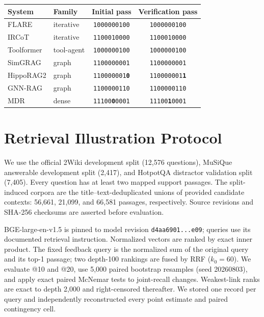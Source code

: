 \documentclass[11pt]{article}
\begin{document}
\begin{center}
\vspace{0.8em}
\label{tab:repeat-codes}
\setlength{\tabcolsep}{2.5pt}
\begin{tabular}{@{}llcc@{}}
\toprule
\textbf{System} & \textbf{Family} & \textbf{Initial pass} & \textbf{Verification pass} \\
\midrule
FLARE & iterative & \texttt{1000000100} & \texttt{1000000100} \\
IRCoT & iterative & \texttt{1100010000} & \texttt{1100010000} \\
Toolformer & tool-agent & \texttt{1000000100} & \texttt{1000000100} \\
SimGRAG & graph & \texttt{1100000001} & \texttt{1100000001} \\
HippoRAG2 & graph & \texttt{110000001\textbf{0}} & \texttt{110000001\textbf{1}} \\
GNN-RAG & graph & \texttt{1100000110} & \texttt{1100000110} \\
MDR & dense & \texttt{11100\textbf{0}0001} & \texttt{11100\textbf{1}0001} \\
\bottomrule
\end{tabular}
\end{center}

\clearpage

\section{Retrieval Illustration Protocol}
\label{app:experiment}
We use the official 2Wiki development split (12,576 questions), MuSiQue answerable development split
(2,417), and HotpotQA distractor validation split (7,405). Every question has at least two mapped
support passages. The split-induced corpora are the title--text-deduplicated unions of provided candidate
contexts: 56,661, 21,099, and 66,581 passages, respectively. Source revisions and SHA-256 checksums are
asserted before evaluation.

BGE-large-en-v1.5 is pinned to model revision \texttt{d4aa6901...e09}; queries use its documented
retrieval instruction.
Normalized vectors are ranked by exact inner product. The fixed feedback query is the normalized sum of
the original query and its top-1 passage; two depth-100 rankings are fused by RRF ($k_0=60$). We evaluate
@10 and @20, use 5,000 paired bootstrap resamples (seed 20260803), and apply exact paired McNemar tests to
joint-recall changes. Weakest-link ranks are exact to depth 2,000 and right-censored thereafter. We stored
one record per query and independently reconstructed every point estimate and paired contingency cell.
\end{document}
